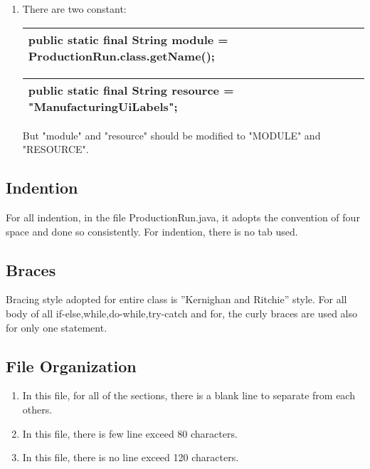 \documentclass{article}
\begin{document}
\begin{enumerate}
\item
There are two constant:\newline
\begin{table}[hpb]
	\label{my-label}
	\begin{tabular}{|l|}
		\hline
		public static final String module 
		= ProductionRun.class.getName();\newline\\
		\hline
	\end{tabular}
\end{table} 
\begin{table}[hpb]
	\label{my-label}
	\begin{tabular}{|l|}
		\hline
		public static final String resource 
		= "ManufacturingUiLabels";\newline\\
		\hline
	\end{tabular}
\end{table} 
But "module" and "resource" should be modified to "MODULE" and "RESOURCE".
\end{enumerate}

\subsection{Indention}
For all indention, in the file ProductionRun.java, it adopts the convention of four space and done so consistently.\newline
For indention, there is no tab used.
 
\subsection{Braces}
Bracing style adopted for entire class is ”Kernighan and Ritchie” style.\newline 
For all body of all if-else,while,do-while,try-catch and for, the curly braces are used also for only one statement.

\subsection{File Organization}
\begin{enumerate}
	\item In this file, for all of the sections, there is a blank line to separate from each others.
	\item In this file, there is few line exceed 80 characters.
	\item In this file, there is no line exceed 120 characters.
\end{enumerate}
\end{document}

